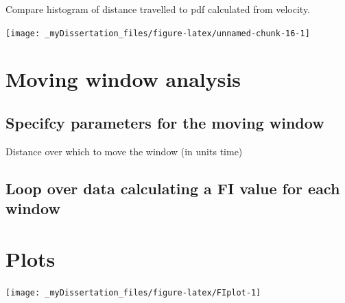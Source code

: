 \documentclass[12pt,twoside,openany]{reedthesis}
\newenvironment{Shaded}{\begin{snugshade}}{\end{snugshade}}
\newcommand{\CommentTok}[1]{\textcolor[rgb]{0.56,0.35,0.01}{\textit{#1}}}
\newcommand{\DataTypeTok}[1]{\textcolor[rgb]{0.13,0.29,0.53}{#1}}
\newcommand{\DecValTok}[1]{\textcolor[rgb]{0.00,0.00,0.81}{#1}}
\newcommand{\KeywordTok}[1]{\textcolor[rgb]{0.13,0.29,0.53}{\textbf{#1}}}
\newcommand{\NormalTok}[1]{#1}
\newcommand{\OperatorTok}[1]{\textcolor[rgb]{0.81,0.36,0.00}{\textbf{#1}}}
\newcommand{\StringTok}[1]{\textcolor[rgb]{0.31,0.60,0.02}{#1}}
\begin{document}
Compare histogram of distance travelled to pdf calculated from velocity.
\begin{center}\texttt{[image: \_myDissertation\_files/figure-latex/unnamed-chunk-16-1]} \end{center}

\hypertarget{moving-window-analysis}{%
\section{Moving window analysis}\label{moving-window-analysis}}

\hypertarget{specifcy-parameters-for-the-moving-window}{%
\subsection{Specifcy parameters for the moving window}\label{specifcy-parameters-for-the-moving-window}}

Distance over which to move the window (in units time)
\begin{Shaded}
\end{Shaded}
\hypertarget{loop-over-data-calculating-a-fi-value-for-each-window}{%
\subsection{Loop over data calculating a FI value for each window}\label{loop-over-data-calculating-a-fi-value-for-each-window}}

\hypertarget{plots}{%
\section{Plots}\label{plots}}
\begin{center}\texttt{[image: \_myDissertation\_files/figure-latex/FIplot-1]} \end{center}
\end{document}
